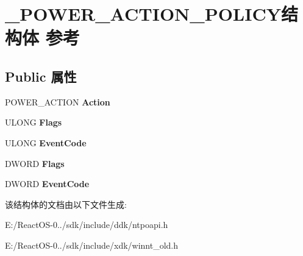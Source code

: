 \hypertarget{struct___p_o_w_e_r___a_c_t_i_o_n___p_o_l_i_c_y}{}\section{\+\_\+\+P\+O\+W\+E\+R\+\_\+\+A\+C\+T\+I\+O\+N\+\_\+\+P\+O\+L\+I\+C\+Y结构体 参考}
\label{struct___p_o_w_e_r___a_c_t_i_o_n___p_o_l_i_c_y}
\subsection*{Public 属性}
\begin{DoxyCompactItemize}
\item 
\mbox{\label{struct___p_o_w_e_r___a_c_t_i_o_n___p_o_l_i_c_y_a6ffca4cabc2e2c4217d95883736540e2}} 
P\+O\+W\+E\+R\+\_\+\+A\+C\+T\+I\+ON {\bfseries Action}
\item 
\mbox{\label{struct___p_o_w_e_r___a_c_t_i_o_n___p_o_l_i_c_y_a5e90114c82aaa5a43d3b9422099cf05d}} 
U\+L\+O\+NG {\bfseries Flags}
\item 
\mbox{\label{struct___p_o_w_e_r___a_c_t_i_o_n___p_o_l_i_c_y_a933f17d400eb6d6114ad62503f7e9c3d}} 
U\+L\+O\+NG {\bfseries Event\+Code}
\item 
\mbox{\label{struct___p_o_w_e_r___a_c_t_i_o_n___p_o_l_i_c_y_ad6f1b908cfc1a1ebf9a396d242704931}} 
D\+W\+O\+RD {\bfseries Flags}
\item 
\mbox{\label{struct___p_o_w_e_r___a_c_t_i_o_n___p_o_l_i_c_y_a576a77de0c9ba0fc4a9fb86a2b30f936}} 
D\+W\+O\+RD {\bfseries Event\+Code}
\end{DoxyCompactItemize}


该结构体的文档由以下文件生成\+:\begin{DoxyCompactItemize}
\item 
E\+:/\+React\+O\+S-\/0../sdk/include/ddk/ntpoapi.\+h\item 
E\+:/\+React\+O\+S-\/0../sdk/include/xdk/winnt\+\_\+old.\+h\end{DoxyCompactItemize}
